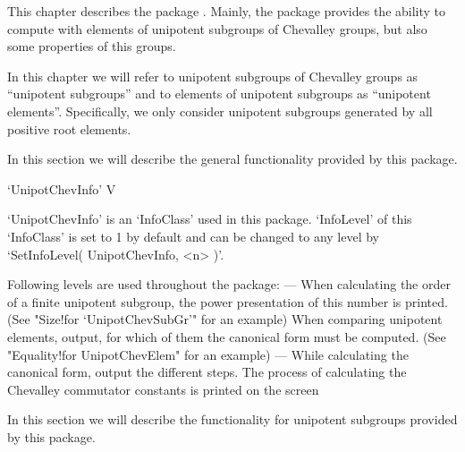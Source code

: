 

This  chapter  describes  the  package  {\Unipot}.  Mainly,  the  package
provides the ability to compute  with  elements of unipotent subgroups of
Chevalley groups, but also some properties of this groups.


In this chapter we will refer to unipotent subgroups of Chevalley  groups
as ``unipotent  subgroups'' and  to elements  of unipotent  subgroups  as
``unipotent   elements''.  Specifically,   we  only  consider   unipotent
subgroups generated by all positive root elements.



In this section we  will  describe the  general functionality provided by
this package.

\>`UnipotChevInfo'  V

`UnipotChevInfo'  is an `InfoClass' used  in this package. `InfoLevel' of
this `InfoClass' is set to  1 by default and can be changed to  any level
by `SetInfoLevel( UnipotChevInfo, <n> )'.

Following levels are used throughout the package:
\beginlist
{}%
    ---
    When calculating the order of a finite unipotent subgroup,  the power
    presentation of this number is printed.
    (See "Size!for `UnipotChevSubGr'" for an example)
    When  comparing  unipotent  elements,  output,  for which of them the
    canonical form must be computed.
    (See "Equality!for UnipotChevElem" for an example)
    ---
    While calculating the canonical form, output the different steps.
    The  process  of  calculating  the  Chevalley commutator constants is
    printed on the screen
\endlist






In this section we will describe the functionality for unipotent
subgroups provided by this package.


